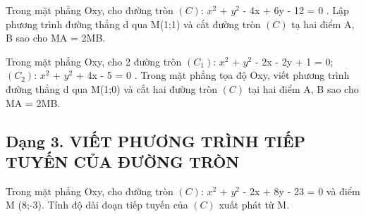 \documentclass[12pt,a4paper]{book}
\begin{document}
\begin{ex}
Trong mặt phẳng Oxy, cho đường tròn $(C)$: $x^2$ + $y^2$ - 4x + 6y - 12 = 0 . Lập phương trình đường thẳng d qua M(1;1) và cắt đường tròn $(C)$ tạ hai điểm A, B sao cho MA = 2MB.
\loigiai{}
\end{ex}

\begin{ex}
Trong mặt phẳng Oxy, cho 2 đường tròn $(C_1)$: $x^2$ + $y^2$ - 2x - 2y + 1 = 0; $(C_2)$: $x^2$ + $y^2$ + 4x - 5 = 0 . Trong mặt phẳng tọa độ Oxy, viết phương trình đường thẳng d qua M(1;0) và cắt hai đường tròn $(C)$ tại hai điểm A, B sao cho MA = 2MB.
\loigiai{}
\end{ex}

\subsection{Dạng 3. VIẾT PHƯƠNG TRÌNH TIẾP TUYẾN CỦA ĐƯỜNG TRÒN}


\begin{ex}
Trong mặt phẳng Oxy, cho đường tròn $(C)$: $x^2$ + $y^2$ - 2x + 8y - 23 = 0 và điểm M (8;-3). Tính độ dài đoạn tiếp tuyến của $(C)$ xuất phát từ M.
\end{ex}
\end{document}
